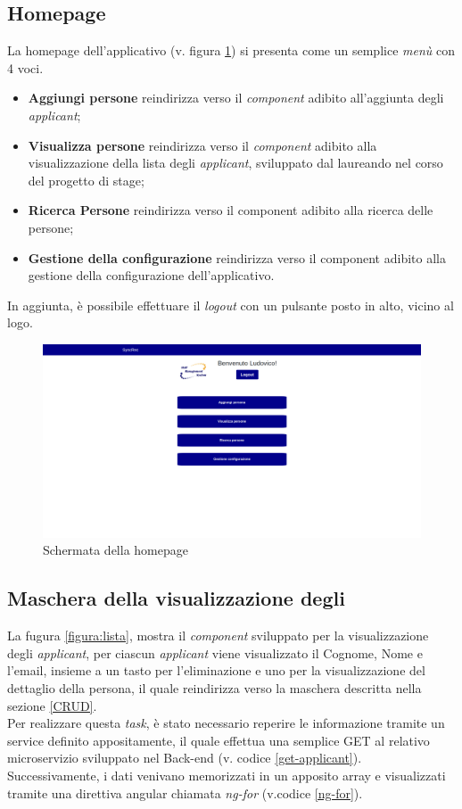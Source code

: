 \subsection{Homepage}
La homepage dell'applicativo (v. figura \ref{figura:homepage}) si presenta come un semplice \textit{menù} con 4 voci.
\begin{itemize}
	\item \textbf{Aggiungi persone} reindirizza verso il \textit{component} adibito all'aggiunta degli \textit{applicant};
	\item \textbf{Visualizza persone} reindirizza verso il \textit{component} adibito alla visualizzazione della lista degli \textit{applicant}, sviluppato dal laureando nel corso del progetto di stage;
	\item \textbf{Ricerca Persone} reindirizza verso il component adibito alla ricerca delle persone;
	\item \textbf{Gestione della configurazione} reindirizza verso il component adibito alla gestione della configurazione dell'applicativo.
\end{itemize}
In aggiunta, è possibile effettuare il \textit{logout} con un pulsante posto in alto, vicino al logo.
\vspace{0.5em}
\begin{figure}[!h] 
	\centering 
	\includegraphics[width=1\columnwidth]{immagini/svil/homepage} 
	\caption{Schermata della homepage}
	\label{figura:homepage}
\end{figure}

\subsection{Maschera della visualizzazione degli\applicant} \label{section: applicant-list}
La fugura \ref{figura:lista}, mostra il \textit{component} sviluppato per la visualizzazione degli \textit{applicant}, per ciascun \textit{applicant} viene visualizzato il Cognome, Nome e l'email, insieme a un tasto per l'eliminazione e uno per la visualizzazione del dettaglio della persona, il quale reindirizza verso la maschera descritta nella sezione \ref{CRUD}.\\
Per realizzare questa \textit{task}, è stato necessario reperire le informazione tramite un service definito appositamente, il quale effettua una semplice GET al relativo microservizio sviluppato nel Back-end (v. codice \ref{get-applicant}).
Successivamente, i dati venivano memorizzati in un apposito array e visualizzati tramite una direttiva angular chiamata \textit{ng-for} (v.codice  \ref{ng-for}).

